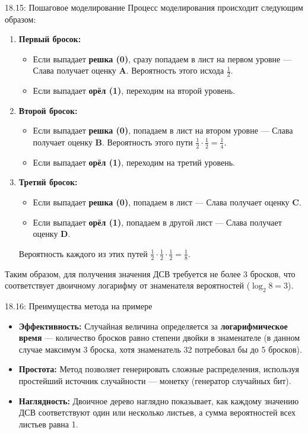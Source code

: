 \documentclass[a4paper,12pt]{article}
\begin{document}
	\begin{remarkbox}{18.15: Пошаговое моделирование}
		Процесс моделирования происходит следующим образом:
		
		\begin{enumerate}
			\item \textbf{Первый бросок:} 
			\begin{itemize}
				\item Если выпадает \textbf{решка (0)}, сразу попадаем в лист на первом уровне — Слава получает оценку \textbf{A}. Вероятность этого исхода \(\frac{1}{2}\).
				\item Если выпадает \textbf{орёл (1)}, переходим на второй уровень.
			\end{itemize}
			
			\item \textbf{Второй бросок:}
			\begin{itemize}
				\item Если выпадает \textbf{решка (0)}, попадаем в лист на втором уровне — Слава получает оценку \textbf{B}. Вероятность этого пути \(\frac{1}{2} \cdot \frac{1}{2} = \frac{1}{4}\).
				\item Если выпадает \textbf{орёл (1)}, переходим на третий уровень.
			\end{itemize}
			
			\item \textbf{Третий бросок:}
			\begin{itemize}
				\item Если выпадает \textbf{решка (0)}, попадаем в лист — Слава получает оценку \textbf{C}.
				\item Если выпадает \textbf{орёл (1)}, попадаем в другой лист — Слава получает оценку \textbf{D}.
			\end{itemize}
			Вероятность каждого из этих путей \(\frac{1}{2} \cdot \frac{1}{2} \cdot \frac{1}{2} = \frac{1}{8}\).
		\end{enumerate}
		
		Таким образом, для получения значения ДСВ требуется не более 3 бросков, что соответствует двоичному логарифму от знаменателя вероятностей (\(\log_2 8 = 3\)).
	\end{remarkbox}
	
	\begin{importantbox}{18.16: Преимущества метода на примере}
		\begin{itemize}
			\item \textbf{Эффективность:} Случайная величина определяется за \textbf{логарифмическое время} — количество бросков равно степени двойки в знаменателе (в данном случае максимум 3 броска, хотя знаменатель 32 потребовал бы до 5 бросков).
			
			\item \textbf{Простота:} Метод позволяет генерировать сложные распределения, используя простейший источник случайности — монетку (генератор случайных бит).
			
			\item \textbf{Наглядность:} Двоичное дерево наглядно показывает, как каждому значению ДСВ соответствуют один или несколько листьев, а сумма вероятностей всех листьев равна 1.
		\end{itemize}
	\end{importantbox}
	
\end{document}
